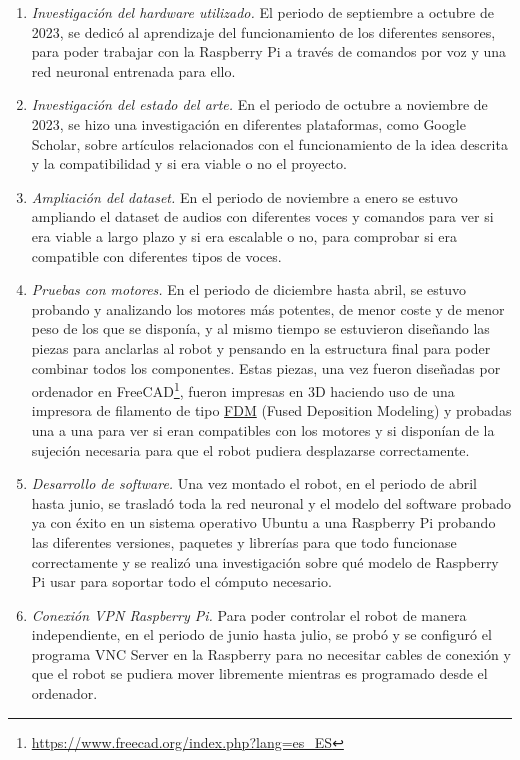 \begin{enumerate}
 \item \textit{Investigación del hardware utilizado.} El periodo de septiembre a octubre de 2023, se dedicó al aprendizaje del funcionamiento de los diferentes sensores, para poder trabajar con la Raspberry Pi a través de comandos por voz y una red neuronal entrenada para ello.

 \item \textit{Investigación del estado del arte.} En el periodo de octubre a noviembre de 2023, se hizo una investigación en diferentes plataformas, como Google Scholar, sobre artículos relacionados con el funcionamiento de la idea descrita y la compatibilidad y si era viable o no el proyecto.
 
  \item \textit{Ampliación del dataset.} En el periodo de noviembre a enero se estuvo ampliando el dataset de audios con diferentes voces y comandos para ver si era viable a largo plazo y si era escalable o no, para comprobar si era compatible con diferentes tipos de voces.
  
  \item \textit{Pruebas con motores.} En el periodo de diciembre hasta abril, se estuvo probando y analizando los motores más potentes, de menor coste y de menor peso de los que se disponía, y al mismo tiempo se estuvieron diseñando las piezas para anclarlas al robot y pensando en la estructura final para poder combinar todos los componentes. Estas piezas, una vez fueron diseñadas por ordenador en FreeCAD\footnote{\url{https://www.freecad.org/index.php?lang=es_ES}}, fueron impresas en 3D haciendo uso de una impresora de filamento de tipo \hyperlink{FDM}{FDM} (Fused Deposition Modeling) y probadas una a una para ver si eran compatibles con los motores y si disponían de la sujeción necesaria para que el robot pudiera desplazarse correctamente.
  
 \item \textit{Desarrollo de software.} Una vez montado el robot, en el periodo de abril hasta junio, se trasladó toda la red neuronal y el modelo del software probado ya con éxito en un sistema operativo Ubuntu a una Raspberry Pi probando las diferentes versiones, paquetes y librerías para que todo funcionase correctamente y se realizó una investigación sobre qué modelo de Raspberry Pi usar para soportar todo el cómputo necesario.
 
  \item \textit{Conexión VPN Raspberry Pi.} Para poder controlar el robot de manera independiente, en el periodo de junio hasta julio, se probó y se configuró el programa VNC Server en la Raspberry para no necesitar cables de conexión y que el robot se pudiera mover libremente mientras es programado desde el ordenador.
  

\end{enumerate}
